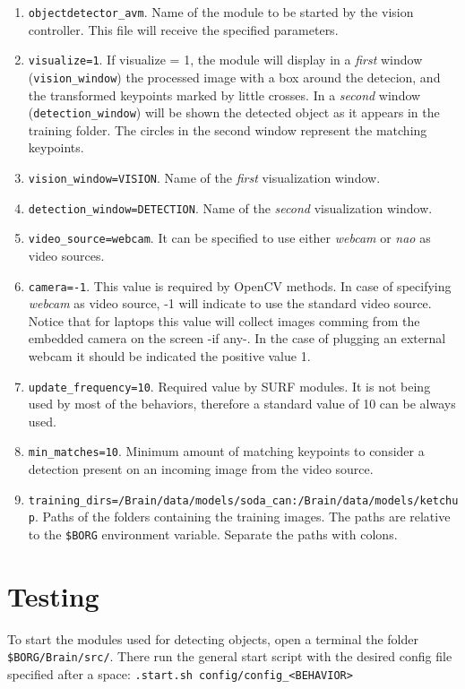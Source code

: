 \documentclass[a4paper, 12pt, oneside]{report}
\begin{document}
\begin{enumerate}
\item{\verb$objectdetector_avm$.} Name of the module to be started by the vision controller. This file will receive the specified parameters.
\item{\verb$visualize=1$.} If visualize = 1, the module will display in a \emph{first} window (\verb=vision_window=) the processed image with a box around the detecion, and the transformed keypoints marked by little crosses. In a \emph{second} window (\verb=detection_window=) will be shown the detected object as it appears in the training folder. The circles in the second window represent the matching keypoints.
\item{\verb$vision_window=VISION$.} Name of the \emph{first} visualization window.
\item{\verb$detection_window=DETECTION$.} Name of the \emph{second} visualization window.
\item{\verb$video_source=webcam$.} It can be specified to use either \emph{webcam} or \emph{nao} as video sources.
\item{\verb$camera=-1$.} This value is required by OpenCV methods. In case of specifying \emph{webcam} as video source, -1 will indicate to use the standard video source. Notice that for laptops this value will collect images comming from the embedded camera on the screen -if any-. In the case of plugging an external webcam it should be indicated the positive value 1.
\item{\verb$update_frequency=10$.} Required value by SURF modules. It is not being used by most of the behaviors, therefore a standard value of 10 can be always used.
\item{\verb$min_matches=10$.} Minimum amount of matching keypoints to consider a detection present on an incoming image from the video source.
\item{\verb$training_dirs=/Brain/data/models/soda_can:/Brain/data/models/ketchup$.} Paths of the folders containing the training images. The paths are relative to the \verb=$BORG= environment variable. Separate the paths with colons.
\end{enumerate}

\section{Testing}
To start the modules used for detecting objects, open a terminal the folder \verb=$BORG/Brain/src/=. There run the general start script with the desired config file specified after a space: \verb=.start.sh config/config_<BEHAVIOR>=
\end{document}
